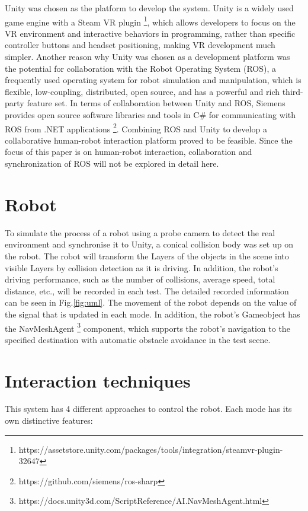 Unity was chosen as the platform to develop the system. Unity is a widely used game engine with a Steam VR plugin \footnote{https://assetstore.unity.com/packages/tools/integration/steamvr-plugin-32647}, which allows developers to focus on the VR environment and interactive behaviors in programming, rather than specific controller buttons and headset positioning, making VR development much simpler. Another reason why Unity was chosen as a development platform was the potential for collaboration with the Robot Operating System (ROS), a frequently used operating system for robot simulation and manipulation, which is flexible, low-coupling, distributed, open source, and has a powerful and rich third-party feature set. In terms of collaboration between Unity and ROS, Siemens provides open source software libraries and tools in C\# for communicating with ROS from .NET applications \footnote{https://github.com/siemens/ros-sharp}. Combining ROS and Unity to develop a collaborative human-robot interaction platform proved to be feasible\cite{Whitney:2018wk}. Since the focus of this paper is on human-robot interaction, collaboration and synchronization of ROS will not be explored in detail here.

\section{Robot}
To simulate the process of a robot using a probe camera to detect the real environment and synchronise it to Unity, a conical collision body was set up on the robot. The robot will transform the Layers of the objects in the scene into visible Layers by collision detection as it is driving. In addition, the robot's driving performance, such as the number of collisions, average speed, total distance, etc., will be recorded in each test. The detailed recorded information can be seen in Fig.\ref{fig:uml}. The movement of the robot depends on the value of the signal that is updated in each mode. In addition, the robot's Gameobject has the NavMeshAgent \footnote{https://docs.unity3d.com/ScriptReference/AI.NavMeshAgent.html} component, which supports the robot's navigation to the specified destination with automatic obstacle avoidance in the test scene.


\section{Interaction techniques}
This system has 4 different approaches to control the robot. Each mode has its own distinctive features: 

